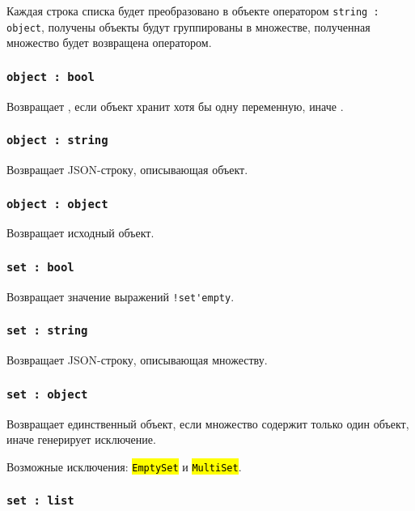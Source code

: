 \documentclass[a4paper, 14pt]{extarticle}
\newcommand{\ferror}[1]{\foreignlanguage{english}{\fontsize{11pt}{12pt}\tt{\sethlcolor{yellow}\hl{#1}}}}
\begin{document}
Каждая строка списка будет преобразовано в объекте оператором \lstinline|string : object|, получены объекты будут группированы в множестве, полученная множество будет возвращена оператором.

\subsubsection{\lstinline|object : bool|}

Возвращает \true, если объект хранит хотя бы одну переменную, иначе \false.

\subsubsection{\lstinline|object : string|}

Возвращает JSON-строку, описывающая объект.

\subsubsection{\lstinline|object : object|}

Возвращает исходный объект.

\subsubsection{\lstinline|set : bool|}

Возвращает значение выражений \lstinline|!set'empty|.

\subsubsection{\lstinline|set : string|}

Возвращает JSON-строку, описывающая множеству.

\subsubsection{\lstinline|set : object|}

Возвращает единственный объект, если множество содержит только один объект, иначе генерирует исключение.

Возможные исключения: \ferror{EmptySet} и \ferror{MultiSet}.

\subsubsection{\lstinline|set : list|}
\end{document}
